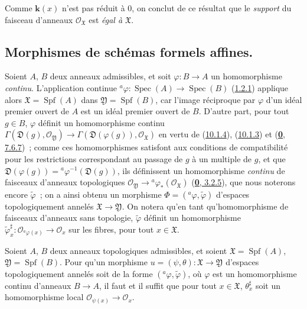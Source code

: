 Comme $\boldsymbol{k}(x)$ n'est pas réduit à 0, on conclut de ce résultat que le
\emph{support} du faisceau d'anneaux $\mathscr{O}_{\mathfrak{X}}$ est
\emph{égal à $\mathfrak{X}$}.

\subsection{Morphismes de schémas formels affines.}
\label{subsection:I.10.2-fr}

\begin{env}[10.2.1]
\label{I.10.2.1-fr}
Soient $A$, $B$ deux anneaux admissibles, et soit
$\varphi:B\to A$ un homomorphisme \emph{continu}. L'application continue
$ {}^a\varphi:\operatorname{Spec}(A)\to\operatorname{Spec}(B)$
(\hyperref[I.1.2.1-fr]{1.2.1}) applique alors
$\mathfrak{X}=\operatorname{Spf}(A)$ dans
$\mathfrak{Y}=\operatorname{Spf}(B)$, car l'image réciproque par
$\varphi$ d'un idéal premier ouvert de $A$ est un idéal premier ouvert de
$B$. D'autre part, pour tout $g\in B$, $\varphi$ définit un homomorphisme
continu
$\Gamma(\mathfrak{D}(g),\mathscr{O}_{\mathfrak{Y}})\to
\Gamma(\mathfrak{D}(\varphi(g)),\mathscr{O}_{\mathfrak{X}})$
en vertu de (\hyperref[I.10.1.4-fr]{10.1.4}),
(\hyperref[I.10.1.3-fr]{10.1.3}) et
(\hyperref[0.7.6.7-fr]{\textbf{0}, 7.6.7})~; comme ces homomorphismes satisfont aux
conditions de compatibilité pour les restrictions correspondant au
passage de $g$ à un multiple de $g$, et que
$\mathfrak{D}(\varphi(g))={}^a\varphi^{-1}(\mathfrak{D}(g))$, ils
définissent un homomorphisme \emph{continu} de faisceaux d'anneaux
topologiques
$\mathscr{O}_{\mathfrak{Y}}\to
{}^a\varphi_*(\mathscr{O}_{\mathfrak{X}})$
(\hyperref[0.3.2.5-fr]{\textbf{0}, 3.2.5}), que nous noterons encore
$\widetilde{\varphi}$~; on a ainsi obtenu un morphisme
$\Phi=({}^a\varphi,\widetilde{\varphi})$ d'espaces topologiquement annelés
$\mathfrak{X}\to\mathfrak{Y}$. On notera qu'en tant qu'homomorphisme de
faisceaux d'anneaux sans topologie, $\widetilde{\varphi}$ définit un
homomorphisme
$\widetilde{\varphi}_x^\sharp:
\mathscr{O}_{{}^a\varphi(x)}\to\mathscr{O}_x$ sur les fibres, pour tout
$x\in\mathfrak{X}$.
\end{env}

\begin{proposition}[10.2.2]
\label{I.10.2.2-fr}
Soient $A$, $B$ deux anneaux topologiques admissibles, et soient
$\mathfrak{X}=\operatorname{Spf}(A)$,
$\mathfrak{Y}=\operatorname{Spf}(B)$. Pour qu'un morphisme
$u=(\psi,\theta):\mathfrak{X}\to\mathfrak{Y}$ d'espaces topologiquement
annelés soit de la forme $({}^a\varphi,\widetilde{\varphi})$, où
$\varphi$ est un homomorphisme continu d'anneaux $B\to A$, il faut et il
suffit que pour tout $x\in\mathfrak{X}$,
$\theta_x^\sharp$ soit un homomorphisme local
$\mathscr{O}_{\psi(x)}\to\mathscr{O}_x$.
\end{proposition}


